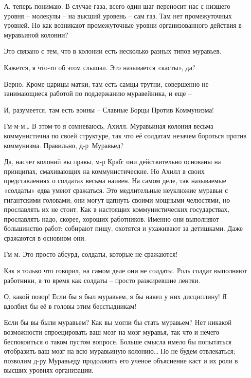 \documentclass[../main.tex]{subfiles}
\begin{document}
\begin{dialogue}
 А, теперь понимаю. В случае газа, всего один шаг переносит нас с низшего уровня \--- молекулы \--- на высший уровень \--- сам газ. Там нет промежуточных уровней. Но как возникают промежуточные уровни организованного действия в муравьиной колонии?

 Это связано с тем, что в колонии есть несколько разных типов муравьев.

 Кажется, я что-то об этом слышал. Это называется «касты», да?

 Верно. Кроме царицы-матки, там есть самцы-трутни, совершенно не занимающиеся работой по поддержанию муравейника, и еще \---

 И, разумеется, там есть воины \--- Славные Борцы Против Коммунизма!

 Гм-м-м\ldots{} В этом-то я сомневаюсь, Ахилл. Муравьиная колония весьма коммунистична по своей структуре, так что её солдатам незачем бороться против коммунизма. Правильно, д-р~Муравьед?

 Да, насчет колоний вы правы, м-р Краб: они действительно основаны на принципах, смахивающих на коммунистические. Но Ахилл в своих представлениях о солдатах весьма наивен. На самом деле, так называемые «солдаты» едва умеют сражаться. Это медлительные неуклюжие муравьи с гигантскими головами; они могут цапнуть своими мощными челюстями, но прославлять их не стоит. Как в настоящих коммунистических государствах, прославлять надо, скорее, хороших работников. Именно они выполняют большинство работ: собирают пищу, охотятся и ухаживают за детишками. Даже сражаются в основном они.

 Гм-м. Это просто абсурд, солдаты, которые не сражаются!

 Как я только что говорил, на самом деле они не солдаты. Роль солдат выполняют работники, в то время как солдаты \--- просто разжиревшие лентяи.

 О, какой позор! Если бы я был муравьем, я бы навел у них дисциплину! Я вдолбил бы её в головы этим бесстыдникам!

 Если бы вы были муравьем? Как вы могли бы стать муравьем? Нет никакой возможности спроецировать ваш мозг на мозг муравья, так что и нечего беспокоиться о таком пустом вопросе. Больше смысла имело бы попытаться отобразить ваш мозг на всю муравьиную колонию\ldots{} Но не будем отвлекаться; позволим д-ру Муравьеду продолжить его ученое объяснение каст и их роли в высших уровнях организации.


\end{dialogue}
\end{document}
